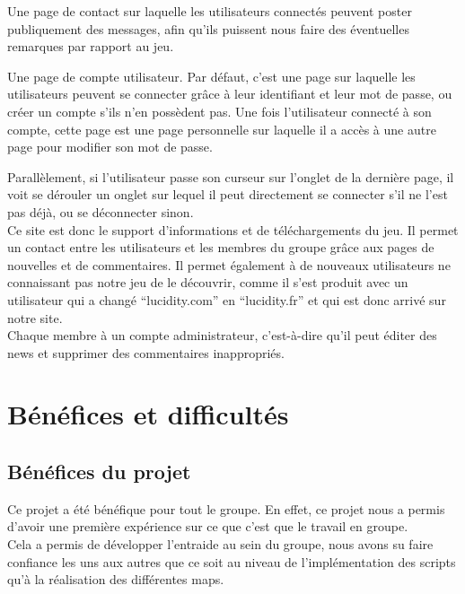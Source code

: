 \documentclass[a4paper , 12pt]{article}
\begin{document}
Une page de contact sur laquelle les utilisateurs connectés peuvent poster publiquement des messages, afin qu’ils puissent nous faire des éventuelles remarques par rapport au jeu.

Une page de compte utilisateur. Par défaut, c’est une page sur laquelle les utilisateurs peuvent se connecter grâce à leur identifiant et leur mot de passe, ou créer un compte s’ils n’en possèdent pas. Une fois l’utilisateur connecté à son compte, cette page est une page personnelle sur laquelle il a accès à une autre page pour modifier son mot de passe.

Parallèlement, si l’utilisateur passe son curseur sur l’onglet de la dernière page, il voit se dérouler un onglet sur lequel il peut directement se connecter s’il ne l’est pas déjà, ou se déconnecter sinon.\\

Ce site est donc le support d’informations et de téléchargements du jeu. Il permet un contact entre les utilisateurs et les membres du groupe grâce aux pages de nouvelles et de commentaires. Il permet également à de nouveaux utilisateurs ne connaissant pas notre jeu de le découvrir, comme il s’est produit avec un utilisateur qui a changé “lucidity.com” en “lucidity.fr” et qui est donc arrivé sur notre site.\\

Chaque membre à un compte administrateur, c’est-à-dire qu’il peut éditer des news et supprimer des commentaires inappropriés.

\newpage

\section{Bénéfices et difficultés}

	\subsection{Bénéfices du projet}
	\quad

Ce projet a été bénéfique pour tout le groupe.
En effet, ce projet nous a permis d’avoir une première expérience sur ce que c’est que le travail en groupe.  \\

Cela a permis de développer l’entraide au sein du groupe, nous avons su faire confiance les uns aux autres que ce soit au niveau de l’implémentation des scripts qu’à la réalisation des différentes maps.\\
\end{document}
